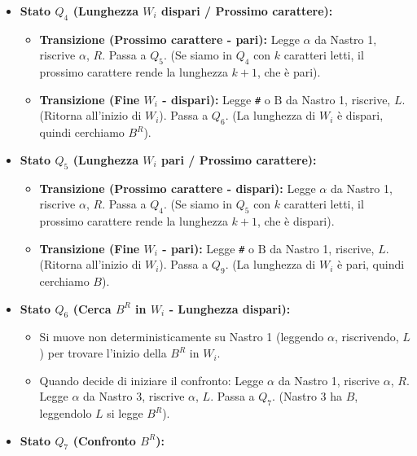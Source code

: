 \documentclass[a4paper, 11pt]{book} %
\theoremstyle{definition}
\newcommand{\B}{\text{B}} %
\begin{document}
\begin{itemize}
\begin{itemize}
        \end{itemize}
    \item \textbf{Stato $Q_4$ (Lunghezza $W_i$ dispari / Prossimo carattere):}
        \begin{itemize}
            \item \textbf{Transizione (Prossimo carattere - pari):}
                Legge $\alpha$ da Nastro 1, riscrive $\alpha$, $R$. Passa a $Q_5$.
                (Se siamo in $Q_4$ con $k$ caratteri letti, il prossimo carattere rende la lunghezza $k+1$, che è pari).
            \item \textbf{Transizione (Fine $W_i$ - dispari):}
                Legge \texttt{\#} o $\B$ da Nastro 1, riscrive, $L$. (Ritorna all'inizio di $W_i$).
                Passa a $Q_6$. (La lunghezza di $W_i$ è dispari, quindi cerchiamo $B^R$).
        \end{itemize}
    \item \textbf{Stato $Q_5$ (Lunghezza $W_i$ pari / Prossimo carattere):}
        \begin{itemize}
            \item \textbf{Transizione (Prossimo carattere - dispari):}
                Legge $\alpha$ da Nastro 1, riscrive $\alpha$, $R$. Passa a $Q_4$.
                (Se siamo in $Q_5$ con $k$ caratteri letti, il prossimo carattere rende la lunghezza $k+1$, che è dispari).
            \item \textbf{Transizione (Fine $W_i$ - pari):}
                Legge \texttt{\#} o $\B$ da Nastro 1, riscrive, $L$. (Ritorna all'inizio di $W_i$).
                Passa a $Q_9$. (La lunghezza di $W_i$ è pari, quindi cerchiamo $B$).
        \end{itemize}
    \item \textbf{Stato $Q_6$ (Cerca $B^R$ in $W_i$ - Lunghezza dispari):}
        \begin{itemize}
            \item Si muove non deterministicamente su Nastro 1 (leggendo $\alpha$, riscrivendo, $L$) per trovare l'inizio della $B^R$ in $W_i$.
            \item Quando decide di iniziare il confronto: Legge $\alpha$ da Nastro 1, riscrive $\alpha$, $R$. Legge $\alpha$ da Nastro 3, riscrive $\alpha$, $L$. Passa a $Q_7$.
            (Nastro 3 ha $B$, leggendolo $L$ si legge $B^R$).
        \end{itemize}
    \item \textbf{Stato $Q_7$ (Confronto $B^R$):}
        \begin{itemize}

\end{itemize}
\end{itemize}
\end{document}
